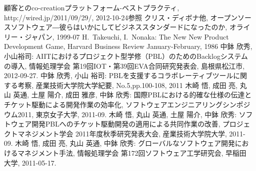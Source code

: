 \documentclass[a4j,9pt,twoside,twocolumn]{jsarticle}
\newcommand{\me}{中鉢 欣秀}
\begin{document}
	\vspace{1cm}
	\begin{thebibliography}{99}
		 顧客とのco-creationプラットフォーム-ベストプラクティ, 
                        http://wired.jp/2011/09/29/,  2012-10-24参照
         クリス・ディボナ他, オープンソースソフトウェア―彼らはいかにしてビジネススタンダードになったのか,
        				オライリー・ジャパン, 1999-07
		 H.~Takeuchi, I.~Nonaka: The New New Product Development Game, Harvard Business Review January-February, 1986
		 \me, 小山裕司: AIITにおけるプロジェクト型学修（PBL）のためのBacklogシステムの導入, 情報処理学会 第19回IOT・第39回EVA合同研究発表会, 島根県松江市, 2012-09-27. 
		\me, 小山 裕司: PBLを支援するコラボレーティブツールに関する考察, 産業技術大学院大学紀要, No.5,pp.100-108, 2011 
		 木崎 悟, 成田 亮, 丸山 英通, 土屋 陽介, 成田 雅彦, \me: 国際PBLにおける的確な仕様の伝達とチケット駆動による開発作業の効率化, ソフトウェアエンジニアリングシンポジウム2011, 東京女子大学, 2011-09.
		 木崎 悟, 丸山 英通, 土屋 陽介, \me: ソフトウェア開発PBLへのチケット駆動開発の適用による共同作業の改善, プロジェクトマネジメント学会 2011年度秋季研究発表大会, 産業技術大学院大学, 2011-09.
		 木崎 悟, 成田 亮, 丸山 英通, \me: グローバルなソフトウェア開発におけるマネジメント手法, 情報処理学会 第172回ソフトウェア工学研究会, 早稲田大学, 2011-05-17.

\end{thebibliography}
\end{document}
